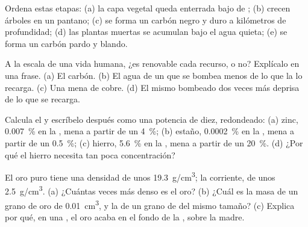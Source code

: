 \begin{exercise}[$\star$]\label{exo:g9:earth-resources:3}
Ordena estas etapas: (a) la capa vegetal queda enterrada bajo  de
; (b) crecen árboles en un pantano; (c) se forma un carbón negro y duro
a kilómetros de profundidad; (d) las plantas muertas se acumulan bajo el
agua quieta; (e) se forma un carbón pardo y blando.
\end{exercise}

\begin{exercise}[$\star$]\label{exo:g9:earth-resources:4}
A la escala de una vida humana, ¿es renovable cada recurso, o no?
Explícalo en una frase. (a) El carbón. (b) El agua de un  que se
bombea menos de lo que la  lo recarga. (c) Una mena de cobre. (d) El
mismo  bombeado dos veces más deprisa de lo que se recarga.
\end{exercise}

\begin{exercise}[$\star\star$]\label{exo:g9:earth-resources:5}
Calcula el  y escríbelo después como una potencia
de diez, redondeado: (a) zinc, \qty{0.007}{\%} en la , mena a partir
de un \qty{4}{\%}; (b) estaño, \qty{0.0002}{\%} en la , mena a
partir de un \qty{0.5}{\%}; (c) hierro, \qty{5.6}{\%} en la , mena
a partir de un \qty{20}{\%}. (d) ¿Por qué el hierro necesita tan poca
concentración?
\end{exercise}

\begin{exercise}[$\star\star$]\label{exo:g9:earth-resources:6}
El oro puro tiene una densidad de unos \qty{19.3}{g/cm^3}; la 
corriente, de unos \qty{2.5}{g/cm^3}. (a) ¿Cuántas veces más denso es el
oro? (b) ¿Cuál es la masa de un grano de oro de \qty{0.01}{cm^3}, y la de
un grano de  del mismo tamaño? (c) Explica por qué, en una , el
oro acaba en el fondo de la , sobre la  madre.
\end{exercise}

